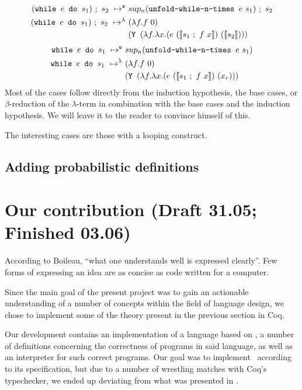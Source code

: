 \documentclass[11pt, leqno, titlepage]{article}
\theoremstyle{definition}
\begin{document}
\begin{align}
  (\texttt{while } e \texttt{ do } s_1) ~;~ s_2
  ~\mapsto^{\texttt{w}}~ & sup_n(\texttt{unfold-while-n-times }e~s_1)~;~s_2 \\
  (\texttt{while } e \texttt{ do } s_1) ~;~ s_2
  ~\mapsto^\lambda~ & (\lambda f. f~0)\notag\\
                         &(\texttt{Y }(\lambda f.\lambda x.(e~(\llbracket
                           s_1~;~f~x\rrbracket) ~(\llbracket s_2\rrbracket )))\notag
\end{align}
\begin{align}
  \texttt{while } e \texttt{ do } s_1
  ~\mapsto^{\texttt{w}}~ & sup_n(\texttt{unfold-while-n-times }e~s_1)\\
  \texttt{while } e \texttt{ do } s_1
  ~\mapsto^\lambda~ & (\lambda f. f~0)\notag\\
                         &(\texttt{Y }(\lambda f.\lambda x.(e~(\llbracket
                           s_1~;~f~x\rrbracket) ~(x_r)))\notag
\end{align}
Most of the cases follow directly from the induction hypothesis, the base cases, or
$\beta$-reduction of the $\lambda$-term in combination with the base cases and the
induction hypothesis. We will leave it to the reader to convince himself of this.

    The interesting cases are those with a looping construct. 


\subsection{Adding probabilistic definitions}\label{sec:probab}


\section{Our contribution (Draft 31.05; Finished 03.06)}\label{sec:contrib}

According to Boileau, ``what one understands well is expressed clearly''. Few forms
of expressing an idea are as concise as code written for a computer.

Since the main goal of the present project was to gain an actionable understanding of
a number of concepts within the field of language design, we chose to implement some
of the theory present in the previous section in Coq.

Our development contains an implementation of a language based on \rml, a number of
definitions concerning the correctness of programs in said language, as well as an
interpreter for such correct programs. Our goal was to implement \rml\ according to
its specification, but due to a number of wrestling matches with Coq's typechecker,
we ended up deviating from what was presented in \cite{rml-paper}.
\end{document}
